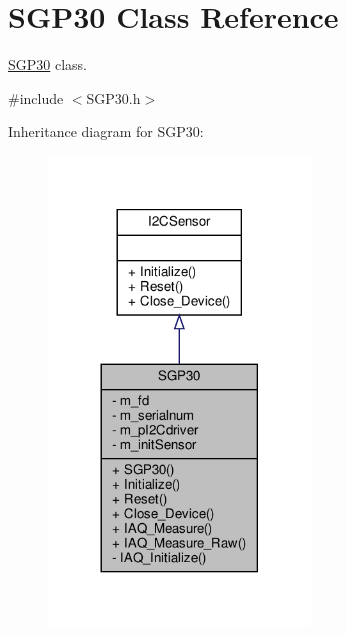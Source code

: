 \hypertarget{classSGP30}{}\section{S\+G\+P30 Class Reference}
\label{classSGP30}


\hyperlink{classSGP30}{S\+G\+P30} class.  




{\ttfamily \#include $<$S\+G\+P30.\+h$>$}



Inheritance diagram for S\+G\+P30\+:\nopagebreak
\begin{figure}[H]
\begin{center}
\leavevmode
\includegraphics[width=197pt]{classSGP30__inherit__graph}
\end{center}
\end{figure}


